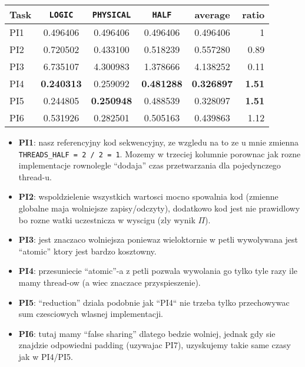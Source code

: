 \documentclass{bmvc2k}
\begin{document}
\begin{table}[H]
\begin{center}
\begin{tabular}{|l|c|c|c|c|r|}
\hline
Task & {\tt LOGIC} & {\tt PHYSICAL} & {\tt HALF} & average &
ratio \\
\hline\hline
PI1 & 0.496406 & 0.496406 & 0.496406 & 0.496406 & 1 \\
PI2 & 0.720502 & 0.433100 & 0.518239 & 0.557280 & 0.89 \\
PI3 & 6.735107 & 4.300983 & 1.378666 & 4.138252 & 0.11 \\
PI4 & \textbf{0.240313} & 0.259092 & \textbf{0.481288} & \textbf{0.326897} &
\textbf{1.51} \\
PI5 & 0.244805 & \textbf{0.250948} & 0.488539 & 0.328097 & \textbf{1.51} \\
PI6 & 0.531926 & 0.282501 & 0.505163 & 0.439863 & 1.12 \\

\hline
\end{tabular}
\end{center}
\end{table}

\begin{itemize}
	\item \textbf{PI1}: nasz referencyjny kod sekwencyjny, ze wzgledu na to ze u
		mnie zmienna \\ {\tt THREADS\_HALF = 2 / 2 = 1}. Mozemy w trzeciej kolumnie
		porownac jak rozne implementacje rownolegle ``dodaja'' czas przetwarzania dla pojedynczego
		thread-u.
	\item \textbf{PI2}: wspoldzielenie wszystkich wartosci mocno spowalnia kod
		(zmienne globalne maja wolniejsze zapisy/odczyty), dodatkowo kod jest
		nie prawidlowy bo rozne watki uczestnicza w wyscigu (zly wynik $\Pi$).
	\item \textbf{PI3}: jest znaczaco wolniejsza poniewaz wieloktornie w petli
		wywolywana jest ``atomic'' ktory jest bardzo kosztowny.
	\item \textbf{PI4}: przesuniecie ``atomic''-a z petli pozwala wywolania go
		tylko tyle razy ile mamy thread-ow (a wiec znaczace przyspieszenie).
	\item \textbf{PI5}: ``reduction'' dziala podobnie jak ``PI4`` nie trzeba
		tylko przechowywac sum czesciowych wlasnej implementacji.
	\item \textbf{PI6}: tutaj mamy ``false sharing'' dlatego bedzie wolniej,
		jednak gdy sie znajdzie odpowiedni padding (uzywajac PI7), uzyskujemy
		takie same czasy jak w PI4/PI5.
\end{itemize}
\end{document}
